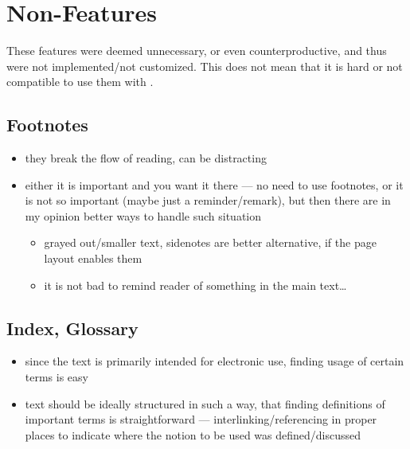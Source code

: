 \section{Non-Features}%
\label{sec:Non-Features}

These features were deemed unnecessary, or even counterproductive, and thus were not implemented/not customized.
This does not mean that it is hard or not compatible to use them with \TeXtured{}.

\subsection{Footnotes}%
\label{sub:Footnotes}

\begin{itemize}
    \item they break the flow of reading, can be distracting
    \item either it is important and you want it there --- no need to use footnotes,
          or it is not so important (maybe just a reminder/remark), but then there
          are in my opinion better ways to handle such situation
          \begin{itemize}
              \item grayed out/smaller text, sidenotes are better alternative, if the page layout enables them
              \item it is not bad to remind reader of something in the main text\ldots
          \end{itemize}
\end{itemize}

\subsection{Index, Glossary}%
\label{sub:Index Glossary}

\begin{itemize}
    \item since the text is primarily intended for electronic use, finding usage of certain terms is easy
    \item text should be ideally structured in such a way, that finding definitions of important terms is straightforward --- interlinking/referencing in proper places to indicate where the notion to be used was defined/discussed
\end{itemize}
